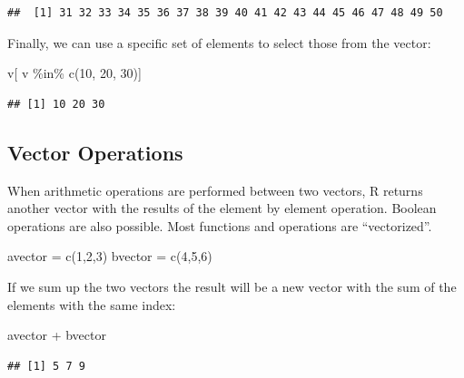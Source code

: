 \documentclass[
]{book}
\newenvironment{Shaded}{\begin{snugshade}}{\end{snugshade}}
\newcommand{\DecValTok}[1]{\textcolor[rgb]{0.00,0.00,0.81}{#1}}
\newcommand{\FunctionTok}[1]{\textcolor[rgb]{0.00,0.00,0.00}{#1}}
\newcommand{\NormalTok}[1]{#1}
\newcommand{\OtherTok}[1]{\textcolor[rgb]{0.56,0.35,0.01}{#1}}
\newcommand{\SpecialCharTok}[1]{\textcolor[rgb]{0.00,0.00,0.00}{#1}}
\begin{document}
\begin{verbatim}
##  [1] 31 32 33 34 35 36 37 38 39 40 41 42 43 44 45 46 47 48 49 50
\end{verbatim}

Finally, we can use a specific set of elements to select those from the vector:

\begin{Shaded}
\begin{Highlighting}[]
\NormalTok{v[ v }\SpecialCharTok{\%in\%} \FunctionTok{c}\NormalTok{(}\DecValTok{10}\NormalTok{, }\DecValTok{20}\NormalTok{, }\DecValTok{30}\NormalTok{)]}
\end{Highlighting}
\end{Shaded}

\begin{verbatim}
## [1] 10 20 30
\end{verbatim}

\hypertarget{vector-operations}{%
\subsection{Vector Operations}\label{vector-operations}}

When arithmetic operations are performed between two vectors, R returns another vector with the results of the element by element operation. Boolean operations are also possible. Most functions and operations are ``vectorized''.

\begin{Shaded}
\begin{Highlighting}[]
\NormalTok{avector }\OtherTok{=} \FunctionTok{c}\NormalTok{(}\DecValTok{1}\NormalTok{,}\DecValTok{2}\NormalTok{,}\DecValTok{3}\NormalTok{)}
\NormalTok{bvector }\OtherTok{=} \FunctionTok{c}\NormalTok{(}\DecValTok{4}\NormalTok{,}\DecValTok{5}\NormalTok{,}\DecValTok{6}\NormalTok{)}
\end{Highlighting}
\end{Shaded}

If we sum up the two vectors the result will be a new vector with the sum of the elements with the same index:

\begin{Shaded}
\begin{Highlighting}[]
\NormalTok{avector }\SpecialCharTok{+}\NormalTok{ bvector}
\end{Highlighting}
\end{Shaded}

\begin{verbatim}
## [1] 5 7 9
\end{verbatim}
\end{document}
